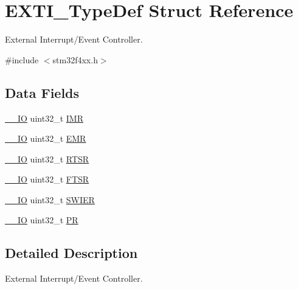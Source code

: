\hypertarget{struct_e_x_t_i___type_def}{\section{E\-X\-T\-I\-\_\-\-Type\-Def Struct Reference}
\label{struct_e_x_t_i___type_def}
}


External Interrupt/\-Event Controller.  




{\ttfamily \#include $<$stm32f4xx.\-h$>$}

\subsection*{Data Fields}
\begin{DoxyCompactItemize}
\item 
\hyperlink{group___c_m_s_i_s__core__definitions_gaec43007d9998a0a0e01faede4133d6be}{\-\_\-\-\_\-\-I\-O} uint32\-\_\-t \hyperlink{struct_e_x_t_i___type_def_ae845b86e973b4bf8a33c447c261633f6}{I\-M\-R}
\item 
\hyperlink{group___c_m_s_i_s__core__definitions_gaec43007d9998a0a0e01faede4133d6be}{\-\_\-\-\_\-\-I\-O} uint32\-\_\-t \hyperlink{struct_e_x_t_i___type_def_a6034c7458d8e6030f6dacecf0f1a3a89}{E\-M\-R}
\item 
\hyperlink{group___c_m_s_i_s__core__definitions_gaec43007d9998a0a0e01faede4133d6be}{\-\_\-\-\_\-\-I\-O} uint32\-\_\-t \hyperlink{struct_e_x_t_i___type_def_a0d952a17455687d6e9053730d028fa1d}{R\-T\-S\-R}
\item 
\hyperlink{group___c_m_s_i_s__core__definitions_gaec43007d9998a0a0e01faede4133d6be}{\-\_\-\-\_\-\-I\-O} uint32\-\_\-t \hyperlink{struct_e_x_t_i___type_def_aa0f7c828c46ae6f6bc9f66f11720bbe6}{F\-T\-S\-R}
\item 
\hyperlink{group___c_m_s_i_s__core__definitions_gaec43007d9998a0a0e01faede4133d6be}{\-\_\-\-\_\-\-I\-O} uint32\-\_\-t \hyperlink{struct_e_x_t_i___type_def_a9eae93b6cc13d4d25e12f2224e2369c9}{S\-W\-I\-E\-R}
\item 
\hyperlink{group___c_m_s_i_s__core__definitions_gaec43007d9998a0a0e01faede4133d6be}{\-\_\-\-\_\-\-I\-O} uint32\-\_\-t \hyperlink{struct_e_x_t_i___type_def_af8d25514079514d38c104402f46470af}{P\-R}
\end{DoxyCompactItemize}


\subsection{Detailed Description}
External Interrupt/\-Event Controller. 

